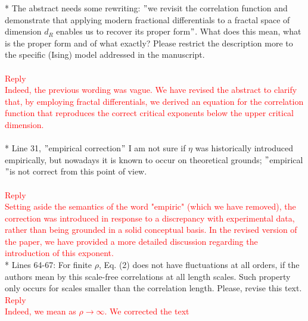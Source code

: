 \documentclass[prd,aps,nofootinbib]{revtex4}
\begin{document}
* The abstract needs some rewriting: $"$we revisit the correlation
function and demonstrate that applying modern fractional differentials
to a fractal space of dimension $d_R$ enables us to recover its proper
form$"$. What does this mean, what is the proper form and of what
exactly? Please restrict the description more to the specific (Ising)
model addressed in the manuscript.\\
\\
\textcolor{red}{Reply}\\
\textcolor{red}{Indeed, the previous wording was vague. We have revised the abstract to clarify that, by employing fractal differentials, we derived an equation for the correlation function that reproduces the correct critical exponents below the upper critical dimension.}\\
\\


* Line 31, $"$empirical correction$"$ I am not sure if $\eta$ was historically introduced empirically, but nowadays it is known to occur on theoretical grounds; $"$empirical$"$is not correct from this point of view.\\
\\
\textcolor{red}{Reply}\\
\textcolor{red}{Setting aside the semantics of the word "empiric" (which we have removed), the correction was introduced in response to a discrepancy with experimental data, rather than being grounded in a solid conceptual basis. In the revised version of the paper, we have provided a more detailed discussion regarding the introduction of this exponent.}
\\


* Lines 64-67: For finite $\rho$, Eq. (2) does not have fluctuations at all orders, if the authors mean by this scale-free correlations at all length scales. Such property only occurs for scales smaller than the correlation length. Please, revise this text.
\\
\textcolor{red}{Reply}\\
\textcolor{red}{ Indeed, we mean as $\rho \rightarrow \infty$. We corrected the text}\\
\\
\end{document}

